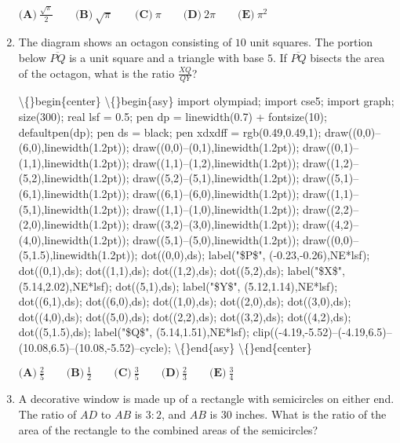 \documentclass{article}
\begin{document}
\begin{enumerate}[label=\arabic*., itemsep=0.5em]
\( \textbf{(A)}\  \frac{\sqrt{\pi}}{2}  \qquad\textbf{(B)}\ \sqrt{\pi} \qquad\textbf{(C)}\ \pi \qquad\textbf{(D)}\ 2\pi \qquad\textbf{(E)}\ \pi^{2}\)\par \vspace{0.5em}\item The diagram shows an octagon consisting of \(10\) unit squares. The portion below \(\overline{PQ}\) is a unit square and a triangle with base \(5\). If \(\overline{PQ}\) bisects the area of the octagon, what is the ratio \(\frac{XQ}{QY}\)?


\textbackslash\{\}begin\{center\}
\textbackslash\{\}begin\{asy\}
import olympiad;
import cse5;
import graph; size(300); 
real lsf = 0.5; 
pen dp = linewidth(0.7) + fontsize(10); 
defaultpen(dp); 
pen ds = black; 
pen xdxdff = rgb(0.49,0.49,1);
draw((0,0)--(6,0),linewidth(1.2pt)); 
draw((0,0)--(0,1),linewidth(1.2pt)); 
draw((0,1)--(1,1),linewidth(1.2pt)); 
draw((1,1)--(1,2),linewidth(1.2pt)); 
draw((1,2)--(5,2),linewidth(1.2pt)); 
draw((5,2)--(5,1),linewidth(1.2pt)); 
draw((5,1)--(6,1),linewidth(1.2pt)); 
draw((6,1)--(6,0),linewidth(1.2pt)); 
draw((1,1)--(5,1),linewidth(1.2pt));
draw((1,1)--(1,0),linewidth(1.2pt)); 
draw((2,2)--(2,0),linewidth(1.2pt)); 
draw((3,2)--(3,0),linewidth(1.2pt)); 
draw((4,2)--(4,0),linewidth(1.2pt)); 
draw((5,1)--(5,0),linewidth(1.2pt));
draw((0,0)--(5,1.5),linewidth(1.2pt));
dot((0,0),ds); label("\$P\$", (-0.23,-0.26),NE*lsf); 
dot((0,1),ds); 
dot((1,1),ds); 
dot((1,2),ds); 
dot((5,2),ds); 
label("\$X\$", (5.14,2.02),NE*lsf); dot((5,1),ds); 
label("\$Y\$", (5.12,1.14),NE*lsf); dot((6,1),ds); 
dot((6,0),ds); dot((1,0),ds); dot((2,0),ds); dot((3,0),ds); 
dot((4,0),ds); dot((5,0),ds); dot((2,2),ds); dot((3,2),ds); 
dot((4,2),ds); dot((5,1.5),ds); 
label("\$Q\$", (5.14,1.51),NE*lsf); 
clip((-4.19,-5.52)--(-4.19,6.5)--(10.08,6.5)--(10.08,-5.52)--cycle);
\textbackslash\{\}end\{asy\}
\textbackslash\{\}end\{center\}


\(\textbf{(A)}\ \frac 25 \qquad
\textbf{(B)}\ \frac 12 \qquad
\textbf{(C)}\ \frac 35 \qquad
\textbf{(D)}\ \frac 23 \qquad
\textbf{(E)}\ \frac 34\)\par \vspace{0.5em}\item A decorative window is made up of a rectangle with semicircles on either end. The ratio of \(AD\) to \(AB\) is \(3:2\), and \(AB\) is 30 inches. What is the ratio of the area of the rectangle to the combined areas of the semicircles? 



\end{enumerate}
\end{document}
